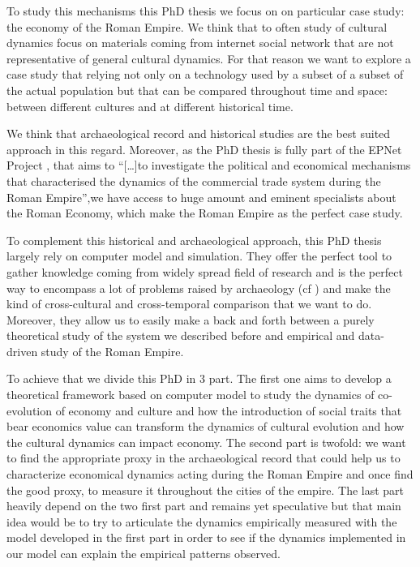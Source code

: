 \documentclass[a4paper]{article}
\begin{document}

To study this mechanisms this PhD thesis we focus on on particular case study: the economy of the Roman Empire. We think that to often study of cultural dynamics focus on materials coming from internet social network that are not representative of general cultural dynamics. For that reason we want to explore a case study that relying not only on a technology used by a subset of a subset of the actual population but that can be compared throughout time and space: between different cultures and at different historical time.

We think that archaeological record and historical studies are the best suited approach in this regard. Moreover, as the PhD thesis is fully part of the EPNet Project \cite{remesal2014epnet}, that aims to ``[\ldots]to investigate the political and economical mechanisms that characterised the dynamics of the commercial trade system during the Roman Empire'',we have access to huge amount and eminent specialists about the Roman Economy, which make the Roman Empire as the perfect case study. 

To complement this historical and archaeological approach, this PhD thesis largely rely on computer model and simulation. They offer the perfect tool to gather knowledge coming from widely spread field of research and is the perfect way to encompass a lot of problems raised by archaeology (cf \cite{wurzer2015agentbasedmodelingandsimulationinarchaeology}) and make the kind of cross-cultural and cross-temporal comparison that we want to do. Moreover, they allow us to easily make a back and forth between a purely theoretical study of the system we described before and empirical and data-driven study of the Roman Empire.


To achieve that we divide this PhD in 3 part. The first one aims to develop a theoretical framework based on computer model to study the dynamics of co-evolution of economy and culture and how the introduction of social traits that bear economics value can transform the dynamics of cultural evolution and how the cultural dynamics can impact economy. The second part is twofold: we want to find the appropriate proxy in the archaeological record that could help us to characterize economical dynamics acting during the Roman Empire and once find the good proxy, to measure it throughout the cities of the empire. The last part heavily depend on the two first part and remains yet speculative but that main idea would be to try to articulate the dynamics empirically measured with the model developed in the first part in order to see if the dynamics implemented in our model can explain the empirical patterns observed.
\end{document}
